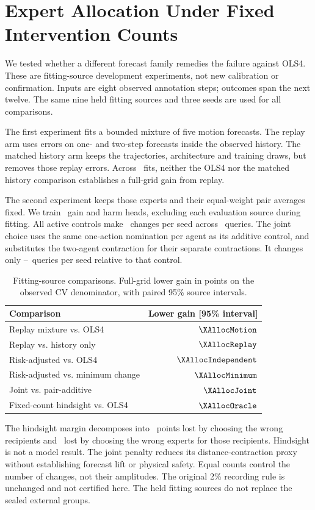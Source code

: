 \section{Expert Allocation Under Fixed Intervention Counts}
We tested whether a different forecast family remedies the failure
against OLS4. These are fitting-source development experiments, not
new calibration or confirmation. Inputs are eight observed annotation
steps; outcomes span the next twelve. The same nine held fitting
sources and three seeds are used for all comparisons.

The first experiment fits a bounded mixture of five motion forecasts.
The replay arm uses errors on one- and two-step forecasts inside the
observed history. The matched history arm keeps the trajectories,
architecture and training draws, but removes those replay errors.
Across \XAllocMotionFits\ fits, neither the OLS4 nor the matched
history comparison establishes a full-grid gain from replay.

The second experiment keeps those experts and their equal-weight
pair averages fixed. We train \XAllocAllocFits\ gain and harm heads,
excluding each evaluation source during fitting. All active controls
make \XAllocSwitches\ changes per seed across \XAllocQueries\ queries.
The joint choice uses the same one-action nomination per agent as
its additive control, and substitutes the two-agent contraction for
their separate contractions. It changes only \XAllocCountLow--\XAllocCountHigh\
queries per seed relative to that control.

\begin{table}[h]
\centering\small
\caption{Fitting-source comparisons. Full-grid lower gain in points
on the observed CV denominator, with paired 95\% source intervals.}
\label{tab:expert-allocation}
\begin{tabular}{@{}lr@{}}
\toprule
Comparison & Lower gain [95\% interval] \\
\midrule
Replay mixture vs. OLS4 & $\XAllocMotion$ \\
Replay vs. history only & $\XAllocReplay$ \\
Risk-adjusted vs. OLS4 & $\XAllocIndependent$ \\
Risk-adjusted vs. minimum change & $\XAllocMinimum$ \\
Joint vs. pair-additive & $\XAllocJoint$ \\
Fixed-count hindsight vs. OLS4 & $\XAllocOracle$ \\
\bottomrule
\end{tabular}
\end{table}

The hindsight margin decomposes into \XAllocRecipient\ points lost
by choosing the wrong recipients and \XAllocExpert\ lost by choosing
the wrong experts for those recipients. Hindsight is not a model
result. The joint penalty reduces its distance-contraction proxy
without establishing forecast lift or physical safety. Equal counts
control the number of changes, not their amplitudes. The original
2\% recording rule is unchanged and not certified here. The held
fitting sources do not replace the sealed external groups.
